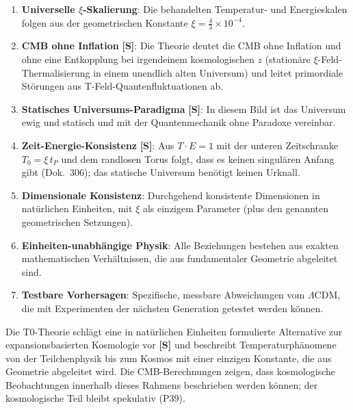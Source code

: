 	\begin{enumerate}
		\item \textbf{Universelle $\xi$-Skalierung}: Die behandelten Temperatur- und Energieskalen folgen aus der geometrischen Konstante $\xi = \frac{4}{3} \times 10^{-4}$.
		
		\item \textbf{CMB ohne Inflation} \textbf{[S]}: Die Theorie deutet die CMB ohne Inflation und ohne eine Entkopplung bei irgendeinem kosmologischen $z$ (stationäre $\xi$-Feld-Thermalisierung in einem unendlich alten Universum) und leitet primordiale Störungen aus T-Feld-Quantenfluktuationen ab.
		
		\item \textbf{Statisches Universums-Paradigma} \textbf{[S]}: In diesem Bild ist das Universum ewig und statisch und mit der Quantenmechanik ohne Paradoxe vereinbar.
		
		\item \textbf{Zeit-Energie-Konsistenz} \textbf{[S]}: Aus $T\cdot E = 1$ mit der unteren Zeitschranke $T_0 = \xi\,t_P$ und dem randlosen Torus folgt, dass es keinen singulären Anfang gibt (Dok.~306); das statische Universum benötigt keinen Urknall.
		
		\item \textbf{Dimensionale Konsistenz}: Durchgehend konsistente Dimensionen in natürlichen Einheiten, mit $\xi$ als einzigem Parameter (plus den genannten geometrischen Setzungen).
		
		\item \textbf{Einheiten-unabhängige Physik}: Alle Beziehungen bestehen aus exakten mathematischen Verhältnissen, die aus fundamentaler Geometrie abgeleitet sind.
		
		\item \textbf{Testbare Vorhersagen}: Spezifische, messbare Abweichungen vom $\Lambda$CDM, die mit Experimenten der nächsten Generation getestet werden können.
	\end{enumerate}
	
	\begin{important}[Fazit]
		Die T0-Theorie schlägt eine in natürlichen Einheiten formulierte Alternative zur expansionsbasierten Kosmologie vor \textbf{[S]} und beschreibt Temperaturphänomene von der Teilchenphysik bis zum Kosmos mit einer einzigen Konstante, die aus Geometrie abgeleitet wird. Die CMB-Berechnungen zeigen, dass kosmologische Beobachtungen innerhalb dieses Rahmens beschrieben werden können; der kosmologische Teil bleibt spekulativ (P39).
	\end{important}
	

